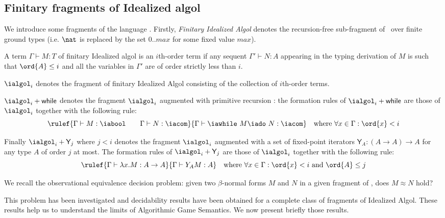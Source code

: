 \subsection{Finitary fragments of Idealized algol}
We introduce
some fragments of the language \ialgol. Firstly, \emph{Finitary
Idealized Algol} denotes the recursion-free sub-fragment of \ialgol\
over finite ground types (i.e. $\nat$ is replaced by the set $0..max$ for some
fixed value $max$).

\begin{definition}
A term $\Gamma \vdash M:T$ of finitary Idealized algol is an $i$th-order term if any sequent $\Gamma' \vdash N:A$ appearing
in the typing derivation of $M$ is such that $\ord{A} \leq i$ and all the variables in $\Gamma'$ are of order strictly less than $i$.
\end{definition}

$\ialgol_i$ denotes the fragment of finitary Idealized Algol
consisting of the collection of $i$th-order terms.

$\ialgol_i + \textsf{while}$ denotes the fragment $\ialgol_i$ augmented with
primitive recursion : the formation rules of $\ialgol_i + \textsf{while}$  are those
of $\ialgol_i$ together with the following rule:
$$  \rulef{\Gamma \vdash M : \iabool \qquad \Gamma \vdash N : \iacom}{\Gamma \vdash \iawhile\ M \iado\ N : \iacom } \quad \mbox{where } \forall x \in \Gamma : \ord{x} < i $$

Finally $\ialgol_i + \textsf{Y}_j$ where $j
< i$ denotes the fragment $\ialgol_i$ augmented with a set of
fixed-point iterators $\textsf{Y}_A : (A\rightarrow A ) \rightarrow
A$ for any type $A$ of order $j$ at most. The formation rules of $\ialgol_i + \textsf{Y}_j$  are those
of $\ialgol_i$ together with the following rule:
$$  \rulef{\Gamma \vdash \lambda x . M : A\rightarrow A}{\Gamma \vdash Y_A M : A} \quad \mbox{where } \forall x \in \Gamma : \ord{x} < i
                                                                            \mbox{ and } \ord{A} \leq j $$

We recall the observational equivalence decision problem: given two
$\beta$-normal forms $M$ and $N$ in a given fragment of \ialgol,
does $M \approx N$ hold?

This problem has been investigated and decidability results have
been obtained for a complete class of fragments of Idealized Algol.
These results help us to understand the limits of Algorithmic Game
Semantics. We now present briefly those results.

